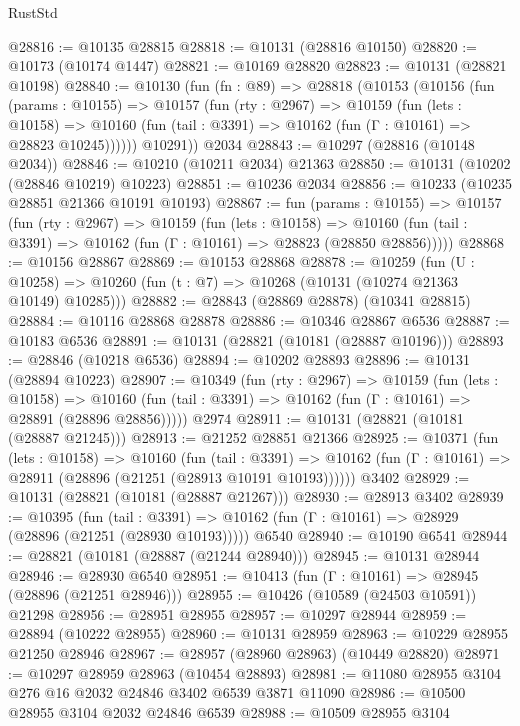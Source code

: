 \begin{lexlean}{RustStd}
\begin{coremodule}
@28816 := @10135 @28815
@28818 := @10131 (@28816 @10150)
@28820 := @10173 (@10174 @1447)
@28821 := @10169 @28820
@28823 := @10131 (@28821 @10198)
@28840 := @10130
    (fun (fn : @89) =>
    @28818
      (@10153
        (@10156
          (fun (params : @10155) =>
          @10157
            (fun (rty : @2967) =>
            @10159
              (fun (lets : @10158) =>
              @10160 (fun (tail : @3391) => @10162 (fun (Γ : @10161) => @28823 @10245))))))
        @10291))
    @2034
@28843 := @10297 (@28816 (@10148 @2034))
@28846 := @10210 (@10211 @2034) @21363
@28850 := @10131 (@10202 (@28846 @10219) @10223)
@28851 := @10236 @2034
@28856 := @10233 (@10235 @28851 @21366 @10191 @10193)
@28867 := fun (params : @10155) =>
  @10157
    (fun (rty : @2967) =>
    @10159
      (fun (lets : @10158) =>
      @10160 (fun (tail : @3391) => @10162 (fun (Γ : @10161) => @28823 (@28850 @28856)))))
@28868 := @10156 @28867
@28869 := @10153 @28868
@28878 := @10259
    (fun (U : @10258) => @10260 (fun (t : @7) => @10268 (@10131 (@10274 @21363 @10149) @10285)))
@28882 := @28843 (@28869 @28878) (@10341 @28815)
@28884 := @10116 @28868 @28878
@28886 := @10346 @28867 @6536
@28887 := @10183 @6536
@28891 := @10131 (@28821 (@10181 (@28887 @10196)))
@28893 := @28846 (@10218 @6536)
@28894 := @10202 @28893
@28896 := @10131 (@28894 @10223)
@28907 := @10349
    (fun (rty : @2967) =>
    @10159
      (fun (lets : @10158) =>
      @10160 (fun (tail : @3391) => @10162 (fun (Γ : @10161) => @28891 (@28896 @28856)))))
    @2974
@28911 := @10131 (@28821 (@10181 (@28887 @21245)))
@28913 := @21252 @28851 @21366
@28925 := @10371
    (fun (lets : @10158) =>
    @10160
      (fun (tail : @3391) =>
      @10162 (fun (Γ : @10161) => @28911 (@28896 (@21251 (@28913 @10191 @10193))))))
    @3402
@28929 := @10131 (@28821 (@10181 (@28887 @21267)))
@28930 := @28913 @3402
@28939 := @10395
    (fun (tail : @3391) => @10162 (fun (Γ : @10161) => @28929 (@28896 (@21251 (@28930 @10193)))))
    @6540
@28940 := @10190 @6541
@28944 := @28821 (@10181 (@28887 (@21244 @28940)))
@28945 := @10131 @28944
@28946 := @28930 @6540
@28951 := @10413 (fun (Γ : @10161) => @28945 (@28896 (@21251 @28946)))
@28955 := @10426 (@10589 (@24503 @10591)) @21298
@28956 := @28951 @28955
@28957 := @10297 @28944
@28959 := @28894 (@10222 @28955)
@28960 := @10131 @28959
@28963 := @10229 @28955 @21250 @28946
@28967 := @28957 (@28960 @28963) (@10449 @28820)
@28971 := @10297 @28959 @28963 (@10454 @28893)
@28981 := @11080 @28955 @3104 @276 @16 @2032 @24846 @3402 @6539 @3871 @11090
@28986 := @10500 @28955 @3104 @2032 @24846 @6539
@28988 := @10509 @28955 @3104

\end{coremodule}
\end{lexlean}
